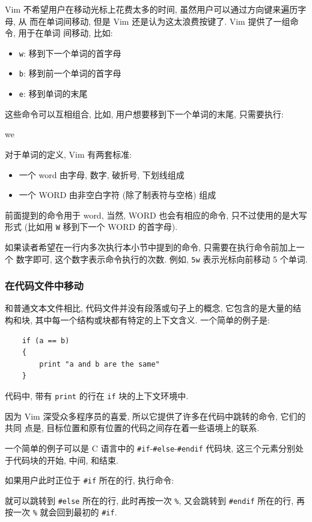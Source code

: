 Vim 不希望用户在移动光标上花费太多的时间, 虽然用户可以通过方向键来遍历字母, 从
而在单词间移动, 但是 Vim 还是认为这太浪费按键了. Vim 提供了一组命令, 用于在单词
间移动, 比如:
\begin{itemize}
    \item \texttt{w}: 移到下一个单词的首字母
    \item \texttt{b}: 移到前一个单词的首字母
    \item \texttt{e}: 移到单词的末尾
\end{itemize}
这些命令可以互相组合, 比如, 用户想要移到下一个单词的末尾, 只需要执行:
\begin{vimcode}
we
\end{vimcode}

对于单词的定义, Vim 有两套标准:
\begin{itemize}
    \item 一个 word 由字母, 数字, 破折号, 下划线组成
    \item 一个 WORD 由非空白字符 (除了制表符与空格) 组成
\end{itemize}
前面提到的命令用于 word, 当然, WORD 也会有相应的命令, 只不过使用的是大写形式
(比如用 \texttt{W} 移到下一个 WORD 的首字母).
\begin{warning}
    如果读者希望在一行内多次执行本小节中提到的命令, 只需要在执行命令前加上一个
    数字即可, 这个数字表示命令执行的次数. 例如, \texttt{5w} 表示光标向前移动 5
    个单词.
\end{warning}

\subsubsection{在代码文件中移动}
\label{subsubsec:moving_in_a_code_file}

和普通文本文件相比, 代码文件并没有段落或句子上的概念, 它包含的是大量的结构和块,
其中每一个结构或块都有特定的上下文含义. 一个简单的例子是:
\begin{verbatim}
    if (a == b)
    {
        print "a and b are the same"
    }
\end{verbatim}
代码中, 带有 \texttt{print} 的行在 \texttt{if} 块的上下文环境中.

因为 Vim 深受众多程序员的喜爱, 所以它提供了许多在代码中跳转的命令, 它们的共同
点是, 目标位置和原有位置的代码之间存在着一些语境上的联系.

一个简单的例子可以是 C 语言中的 \texttt{\#if}-\texttt{\#else}-\texttt{\#endif}
代码块, 这三个元素分别处于代码块的开始, 中间, 和结束.

如果用户此时正位于 \texttt{\#if} 所在的行, 执行命令:
\begin{vimcode}
%
\end{vimcode}
就可以跳转到 \texttt{\#else} 所在的行, 此时再按一次 \verb'%', 又会跳转到
\texttt{\#endif} 所在的行, 再按一次 \verb'%' 就会回到最初的 \texttt{\#if}.

